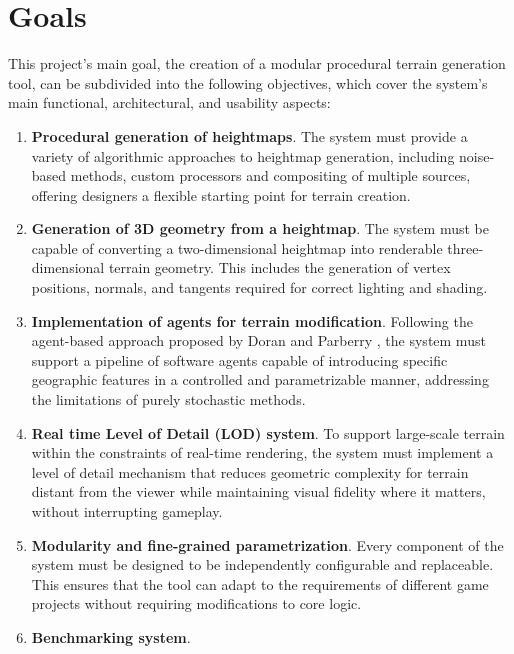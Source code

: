 

\chapter{Goals} \label{chap:Goals}
This project's main goal, the creation of a modular procedural terrain generation tool, can be subdivided into the following objectives, which cover the system’s main functional, architectural, and usability aspects:
\begin{enumerate}
    \item \textbf{Procedural generation of heightmaps}.
    The system must provide a variety of algorithmic approaches to heightmap generation, including noise-based methods, custom processors and compositing of multiple sources, offering designers a flexible starting point for terrain creation.
    \item \textbf{Generation of 3D geometry from a heightmap}.
    The system must be capable of converting a two-dimensional heightmap into renderable three-dimensional terrain geometry.
    This includes the generation of vertex positions, normals, and tangents required for correct lighting and shading.
    \item \textbf{Implementation of agents for terrain modification}.
    Following the agent-based approach proposed by Doran and Parberry \cite{Doran:2010:CPT}, the system must support a pipeline of software agents capable of introducing specific geographic features in a controlled and parametrizable manner, addressing the limitations of purely stochastic methods.
    \item \textbf{Real time Level of Detail (LOD) system}. 
    To support large-scale terrain within the constraints of real-time rendering, the system must implement a level of detail mechanism that reduces geometric complexity for terrain distant from the viewer while maintaining visual fidelity where it matters, without interrupting gameplay.
    \item \textbf{Modularity and fine-grained parametrization}.
    Every component of the system must be designed to be independently configurable and replaceable. 
    This ensures that the tool can adapt to the requirements of different game projects without requiring modifications to core logic.
    \item \textbf{Benchmarking system}.

\end{enumerate}
